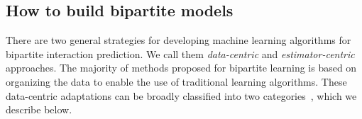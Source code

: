 \subsection{How to build bipartite models}

There are two general strategies for developing machine learning algorithms for bipartite interaction prediction. We call them \emph{data-centric} and \emph{estimator-centric} approaches.
%
The majority of methods proposed for bipartite learning is based on organizing the data to enable the use of traditional learning algorithms. These data-centric adaptations can be broadly classified into two categories~\cite{schrynemackers2015classifying,pliakos2018global,pliakos2020drugtarget}, which we describe below.

